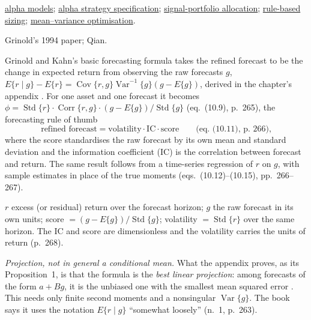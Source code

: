 \begin{qfmethod}
 \hyperref[def:alpha-model-taxonomy]{alpha models}; \hyperref[meth:alpha-strategy-specification]{alpha strategy specification}; \hyperref[meth:signal-portfolio-allocation]{signal-portfolio allocation}; \hyperref[meth:rule-based-position-sizing]{rule-based sizing}; \hyperref[mod:mean-variance-portfolio-optimisation]{mean--variance optimisation}.

 Grinold's 1994 paper; Qian.

\end{qfmethod}

\begin{qfmethod}[Scaling a raw signal into a return forecast: alpha $=$ volatility $\times$ IC $\times$ score, and combining two correlated signals]\label{meth:forecast-scaling-ic}
 Grinold and Kahn's basic forecasting formula takes the refined forecast to be the change in expected return from observing the raw forecasts $g$, $E\{r\mid g\}-E\{r\}=\operatorname{Cov}\{r,g\}\operatorname{Var}^{-1}\{g\}(g-E\{g\})$, derived in the chapter's appendix \citep[chap.~10, eqs.~(10.1)--(10.2), pp.~262--263]{alpha-grinold}. For one asset and one forecast it becomes $\phi=\operatorname{Std}\{r\}\cdot\operatorname{Corr}\{r,g\}\cdot(g-E\{g\})/\operatorname{Std}\{g\}$ (eq.~(10.9), p.~265), the forecasting rule of thumb
\[ \text{refined forecast}=\text{volatility}\cdot\mathrm{IC}\cdot\text{score}\qquad\text{(eq.~(10.11), p.~266),} \]
where the score standardises the raw forecast by its own mean and standard deviation and the information coefficient (IC) is the correlation between forecast and return. The same result follows from a time-series regression of $r$ on $g$, with sample estimates in place of the true moments (eqs.~(10.12)--(10.15), pp.~266--267).

 $r$ excess (or residual) return over the forecast horizon; $g$ the raw forecast in its own units; score $=(g-E\{g\})/\operatorname{Std}\{g\}$; volatility $=\operatorname{Std}\{r\}$ over the same horizon. The IC and score are dimensionless and the volatility carries the units of return (p.~268).

 \emph{Projection, not in general a conditional mean.} What the appendix proves, as its Proposition~1, is that the formula is the \emph{best linear projection}: among forecasts of the form $a+Bg$, it is the unbiased one with the smallest mean squared error \citep[chap.~10, Technical Appendix, pp.~287--289]{alpha-grinold}. This needs only finite second moments and a nonsingular $\operatorname{Var}\{g\}$. The book says it uses the notation $E\{r\mid g\}$ ``somewhat loosely'' (n.~1, p.~263).


\end{qfmethod}
